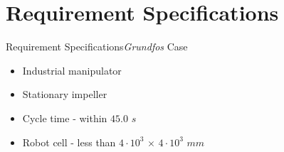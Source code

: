 \section{Requirement Specifications}
\begin{frame}{Requirement Specifications}{\textit{Grundfos} Case}
\begin{itemize}
    \item Industrial manipulator
    \item Stationary impeller
    \item Cycle time - within $45.0$ $s$
    \item Robot cell - less than $4\cdot10^{3}$ $\times$ $4\cdot10^{3}$ $mm$
\end{itemize}
\vspace{5mm}
\end{frame}

